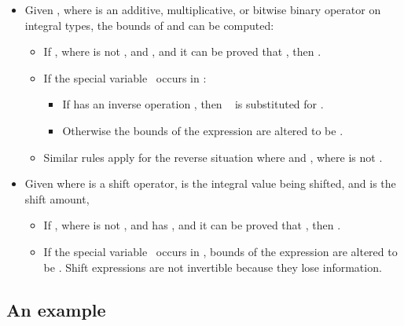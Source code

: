 \begin{itemize}
\item
  Given   , where  is an additive, multiplicative, or bitwise
  binary operator on integral types, the bounds of  and  can be
  computed:

  \begin{itemize}
  \item
    If , where  is not \boundsunknown, and 
    , and it can be proved that  , then
    .
  \item
    If the special variable \exprcurrentvalue\ occurs in :
    \begin{itemize}
    \item
      If  has an inverse operation , then 
      \exprcurrentvalue\   is substituted for \exprcurrentvalue.
    \item
      Otherwise the bounds of the expression are altered to be \boundsunknown.
    \end{itemize}
  \item
    Similar rules apply for the reverse situation where 
    and , where  is not \boundsunknown.
  \end{itemize}
\item
  Given    where  is a shift operator,  is the integral value
  being shifted, and  is the shift amount,

  \begin{itemize}
  \item
    If , where  is not \boundsunknown, and  has
    \boundsunknown, and it can be proved that  , then .
  \item
    If the special variable \exprcurrentvalue\ occurs in ,
    bounds of the expression are altered to be \boundsunknown. Shift
    expressions are not invertible because they lose information.
  \end{itemize}
\end{itemize}

\subsection{An example}

